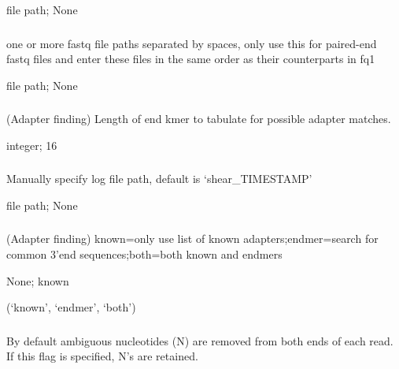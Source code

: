 \documentclass[letterpaper,11pt,english]{sphinxmanual}
\begin{document}
 file path;  None


\subsubsection{}
\label{\detokenize{prog_desc:id5}}
 one or more fastq file paths separated by spaces, only use this for paired-end fastq files and enter these files in the same order as their counterparts in \textendash{}fq1

 file path;  None


\subsubsection{}
\label{\detokenize{prog_desc:k-adapter-end-klength}}
 (Adapter finding) Length of end kmer to tabulate for possible adapter matches.

 integer;  16


\subsubsection{}
\label{\detokenize{prog_desc:log-path}}
 Manually specify log file path, default is ‘shear\_TIMESTAMP’

 file path;  None


\subsubsection{}
\label{\detokenize{prog_desc:m-adapter-mode}}
 (Adapter finding) known=only use list of known adapters;endmer=search for common 3’end sequences;both=both known and endmers

 None;  known

 (‘known’, ‘endmer’, ‘both’)


\subsubsection{}
\label{\detokenize{prog_desc:n-retain-ambig}}
 By default ambiguous nucleotides (N) are removed from both ends of each read. If this flag is specified, N’s are retained.
\end{document}
